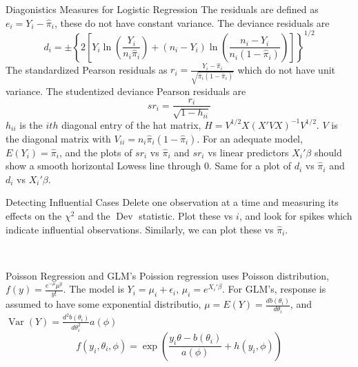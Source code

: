 \documentclass{article}
\DeclareMathOperator{\Var}{Var}
\DeclareMathOperator{\dev}{Dev}
\begin{document}
\begin{multicols*}{3}
\begin{blackbox}{Diagonistics Measures for Logistic Regression}
            The residuals are defined as $e_i = Y_i - \hat{\pi}_i$, these do not have constant variance. The deviance residuals are \\[-3ex] 
            \[d_i = \pm \left\{2\left[Y_i \ln\left(\frac{Y_i}{n_i\hat{\pi}_i}\right) + (n_i-Y_i)\ln\left(\frac{n_i-Y_i}{n_i(1-\hat{\pi}_i)}\right)\right]\right\}^{1/2}\]
            The standardized Pearson residuals as $r_i = \frac{Y_i - \hat{\pi}_i}{\sqrt{\hat{\pi}_i (1- \hat{\pi}_i)}}$
            which do not have unit variance. The studentized deviance Pearson residuals are\\[-3ex]
            \[sr_i = \frac{r_i}{\sqrt{1-h_{ii}}}\]
            $h_{ii}$ is the $ith$ diagonal entry of the hat matrix, $H = V^{1/2}X(X'VX)^{-1}V^{1/2}$. $V$ is the diagonal matrix with $V_{ii} = n_i\hat{\pi}_i(1-\hat{\pi}_i)$. 
            For an adequate model, $E(Y_i) = \hat{\pi}_i$, and the plots of $sr_i$ vs $\hat{\pi}_i$ and $sr_i$ vs linear predictors $X_i'\beta$ should show a smooth horizontal Lowess line through 0. Same for a plot of $d_i$ vs $\hat{\pi}_i$ and $d_i$ vs $X_i'\beta$.

            \begin{pinkbox}{Detecting Influential Cases}
                Delete one observation at a time and measuring its effects on the $\chi^2$ and the $\dev$ statistic. Plot these vs $i$, and look for spikes which indicate influential observations. Similarly, we can plot these vs $\hat{\pi}_i$.
            \end{pinkbox}\\[-2ex]
        \end{blackbox}
        \begin{blackbox}{Poisson Regression and GLM's}
            Poission regression uses Poisson distribution, $f(y) = \frac{e^{-\mu}\mu^y}{y!}$.
            The model is $Y_i = \mu_i + \epsilon_i$, $\mu_i = e^{X_i'
            \beta}$. For GLM's, response is assumed to have some exponential distributio, $\mu = E(Y) = \frac{db(\theta_i)}{d\theta_i}$, and $\Var(Y) = \frac{d^2b(\theta_i)}{d\theta_i^2}a(\phi)$ \\[-2ex]
            \[f(y_i, \theta_i, \phi) = \exp\left(\frac{y_i\theta - b(\theta_i)}{a(\phi)} + h(y_i, \phi)\right)\]
        \end{blackbox}
    \end{multicols*}
    
\end{document}
